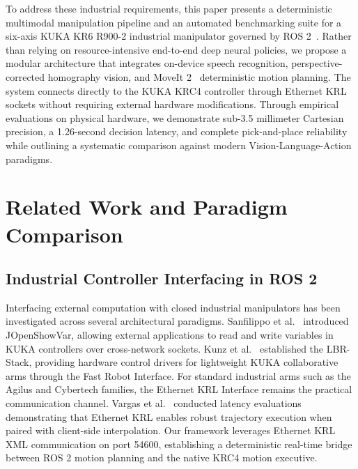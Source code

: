 \documentclass[runningheads]{llncs}
\begin{document}
To address these industrial requirements, this paper presents a deterministic multimodal manipulation pipeline and an automated benchmarking suite for a six-axis KUKA KR6 R900-2 industrial manipulator governed by ROS 2~\cite{ros2_2022}. Rather than relying on resource-intensive end-to-end deep neural policies, we propose a modular architecture that integrates on-device speech recognition, perspective-corrected homography vision, and MoveIt 2~\cite{moveit2014} deterministic motion planning. The system connects directly to the KUKA KRC4 controller through Ethernet KRL sockets without requiring external hardware modifications. Through empirical evaluations on physical hardware, we demonstrate sub-3.5 millimeter Cartesian precision, a 1.26-second decision latency, and complete pick-and-place reliability while outlining a systematic comparison against modern Vision-Language-Action paradigms.

\section{Related Work and Paradigm Comparison}
\label{sec:related_work}

\subsection{Industrial Controller Interfacing in ROS 2}
Interfacing external computation with closed industrial manipulators has been investigated across several architectural paradigms. Sanfilippo et al.~\cite{jopenshowvar2015} introduced JOpenShowVar, allowing external applications to read and write variables in KUKA controllers over cross-network sockets. Kunz et al.~\cite{lbr_stack2024} established the LBR-Stack, providing hardware control drivers for lightweight KUKA collaborative arms through the Fast Robot Interface. For standard industrial arms such as the Agilus and Cybertech families, the Ethernet KRL Interface remains the practical communication channel. Vargas et al.~\cite{kuka_eki_eval2022} conducted latency evaluations demonstrating that Ethernet KRL enables robust trajectory execution when paired with client-side interpolation. Our framework leverages Ethernet KRL XML communication on port 54600, establishing a deterministic real-time bridge between ROS 2 motion planning and the native KRC4 motion executive.
\end{document}
